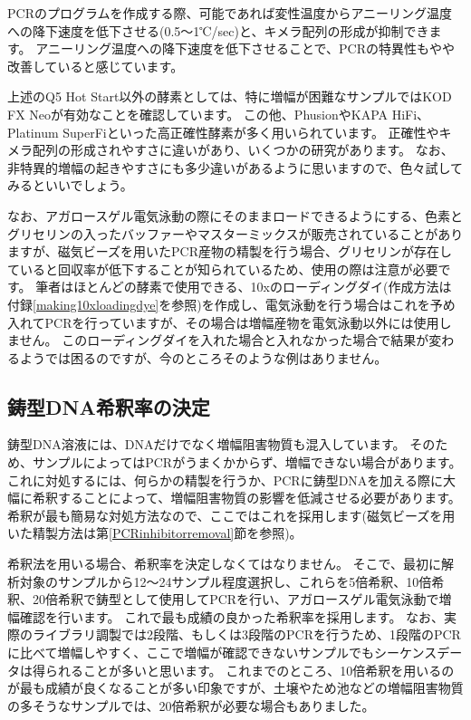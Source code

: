 \documentclass[titlepage,10pt,a4paper,uplatex]{jsbook}
\begin{document}
PCRのプログラムを作成する際、可能であれば変性温度からアニーリング温度への降下速度を低下させる(0.5～1℃/sec)と、キメラ配列の形成が抑制できます\citep{Stevens2013}。
アニーリング温度への降下速度を低下させることで、PCRの特異性もやや改善していると感じています。

上述のQ5 Hot Start以外の酵素としては、特に増幅が困難なサンプルではKOD FX Neoが有効なことを確認しています。
この他、PhusionやKAPA HiFi、Platinum SuperFiといった高正確性酵素が多く用いられています。
正確性やキメラ配列の形成されやすさに違いがあり、いくつかの研究があります\citep{Potapov2017,Hallmaier-Wacker2018,Sze2019}。
なお、非特異的増幅の起きやすさにも多少違いがあるように思いますので、色々試してみるといいでしょう。

なお、アガロースゲル電気泳動の際にそのままロードできるようにする、色素とグリセリンの入ったバッファーやマスターミックスが販売されていることがありますが、磁気ビーズを用いたPCR産物の精製を行う場合、グリセリンが存在していると回収率が低下することが知られているため、使用の際は注意が必要です。
筆者はほとんどの酵素で使用できる、10xのローディングダイ(作成方法は付録\ref{making10xloadingdye}を参照)を作成し、電気泳動を行う場合はこれを予め入れてPCRを行っていますが、その場合は増幅産物を電気泳動以外には使用しません。
このローディングダイを入れた場合と入れなかった場合で結果が変わるようでは困るのですが、今のところそのような例はありません。

\subsection{鋳型DNA希釈率の決定}

鋳型DNA溶液には、DNAだけでなく増幅阻害物質も混入しています。
そのため、サンプルによってはPCRがうまくかからず、増幅できない場合があります。
これに対処するには、何らかの精製を行うか、PCRに鋳型DNAを加える際に大幅に希釈することによって、増幅阻害物質の影響を低減させる必要があります。
希釈が最も簡易な対処方法なので、ここではこれを採用します(磁気ビーズを用いた精製方法は第\ref{PCRinhibitorremoval}節を参照)。

希釈法を用いる場合、希釈率を決定しなくてはなりません。
そこで、最初に解析対象のサンプルから12～24サンプル程度選択し、これらを5倍希釈、10倍希釈、20倍希釈で鋳型として使用してPCRを行い、アガロースゲル電気泳動で増幅確認を行います。
これで最も成績の良かった希釈率を採用します。
なお、実際のライブラリ調製では2段階、もしくは3段階のPCRを行うため、1段階のPCRに比べて増幅しやすく、ここで増幅が確認できないサンプルでもシーケンスデータは得られることが多いと思います。
これまでのところ、10倍希釈を用いるのが最も成績が良くなることが多い印象ですが、土壌やため池などの増幅阻害物質の多そうなサンプルでは、20倍希釈が必要な場合もありました。
\end{document}
